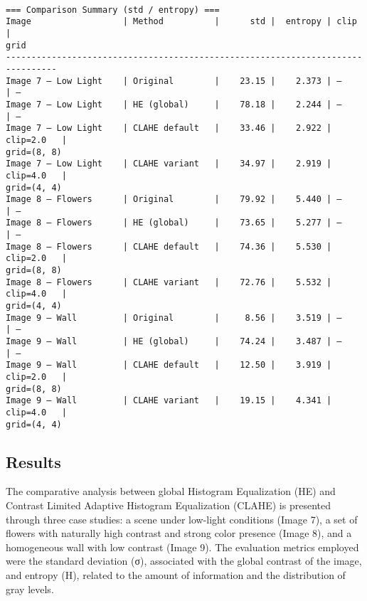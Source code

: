 \documentclass[11pt]{article}
\begin{document}
    \begin{Verbatim}[commandchars=\\\{\}]

=== Comparison Summary (std / entropy) ===
Image                  | Method          |      std |  entropy | clip       |
grid
--------------------------------------------------------------------------------
Image 7 — Low Light    | Original        |    23.15 |    2.373 | —          | —
Image 7 — Low Light    | HE (global)     |    78.18 |    2.244 | —          | —
Image 7 — Low Light    | CLAHE default   |    33.46 |    2.922 | clip=2.0   |
grid=(8, 8)
Image 7 — Low Light    | CLAHE variant   |    34.97 |    2.919 | clip=4.0   |
grid=(4, 4)
Image 8 — Flowers      | Original        |    79.92 |    5.440 | —          | —
Image 8 — Flowers      | HE (global)     |    73.65 |    5.277 | —          | —
Image 8 — Flowers      | CLAHE default   |    74.36 |    5.530 | clip=2.0   |
grid=(8, 8)
Image 8 — Flowers      | CLAHE variant   |    72.76 |    5.532 | clip=4.0   |
grid=(4, 4)
Image 9 — Wall         | Original        |     8.56 |    3.519 | —          | —
Image 9 — Wall         | HE (global)     |    74.24 |    3.487 | —          | —
Image 9 — Wall         | CLAHE default   |    12.50 |    3.919 | clip=2.0   |
grid=(8, 8)
Image 9 — Wall         | CLAHE variant   |    19.15 |    4.341 | clip=4.0   |
grid=(4, 4)
    \end{Verbatim}

    \hypertarget{results}{%
\subsection{Results}\label{results}}

The comparative analysis between global Histogram Equalization (HE) and
Contrast Limited Adaptive Histogram Equalization (CLAHE) is presented
through three case studies: a scene under low-light conditions (Image
7), a set of flowers with naturally high contrast and strong color
presence (Image 8), and a homogeneous wall with low contrast (Image 9).
The evaluation metrics employed were the standard deviation (σ),
associated with the global contrast of the image, and entropy (H),
related to the amount of information and the distribution of gray
levels.
\end{document}

